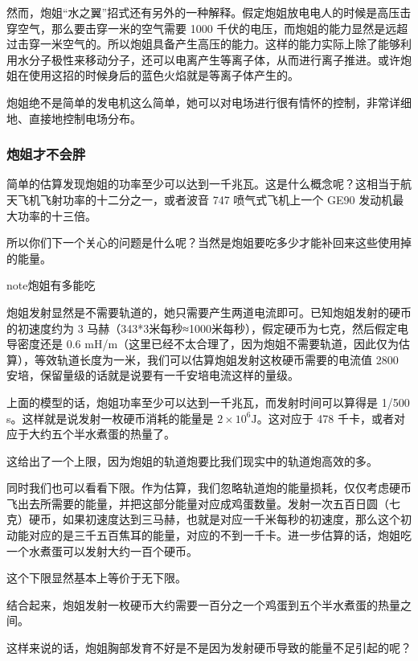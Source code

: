 \documentclass[letterpaper,10pt,english]{sphinxmanual}
\begin{document}
然而，炮姐“水之翼”招式还有另外的一种解释。假定炮姐放电电人的时候是高压击穿空气，那么要击穿一米的空气需要 1000 千伏的电压，而炮姐的能力显然是远超过击穿一米空气的。所以炮姐具备产生高压的能力。这样的能力实际上除了能够利用水分子极性来移动分子，还可以电离产生等离子体，从而进行离子推进。或许炮姐在使用这招的时候身后的蓝色火焰就是等离子体产生的。

炮姐绝不是简单的发电机这么简单，她可以对电场进行很有情怀的控制，非常详细地、直接地控制电场分布。


\subsubsection{炮姐才不会胖}
\label{superpower:id8}
简单的估算发现炮姐的功率至少可以达到一千兆瓦。这是什么概念呢？这相当于航天飞机飞射功率的十二分之一，或者波音 747 喷气式飞机上一个 GE90 发动机最大功率的十三倍。

所以你们下一个关心的问题是什么呢？当然是炮姐要吃多少才能补回来这些使用掉的能量。

\begin{notice}{note}{炮姐有多能吃}

炮姐发射显然是不需要轨道的，她只需要产生两道电流即可。已知炮姐发射的硬币的初速度约为 3 马赫（343*3米每秒≈1000米每秒），假定硬币为七克，然后假定电导密度还是 0.6 mH/m（这里已经不太合理了，因为炮姐不需要轨道，因此仅为估算），等效轨道长度为一米，我们可以估算炮姐发射这枚硬币需要的电流值 2800 安培，保留量级的话就是说要有一千安培电流这样的量级。
\end{notice}

上面的模型的话，炮姐功率至少可以达到一千兆瓦，而发射时间可以算得是 1/500 s。这样就是说发射一枚硬币消耗的能量是 $2\times 10^6 \mathrm{J}$。这对应于 478 千卡，或者对应于大约五个半水煮蛋的热量了。

这给出了一个上限，因为炮姐的轨道炮要比我们现实中的轨道炮高效的多。

同时我们也可以看看下限。作为估算，我们忽略轨道炮的能量损耗，仅仅考虑硬币飞出去所需要的能量，并把这部分能量对应成鸡蛋数量。发射一次五百日圆（七克）硬币，如果初速度达到三马赫，也就是对应一千米每秒的初速度，那么这个初动能对应的是三千五百焦耳的能量，对应的不到一千卡。进一步估算的话，炮姐吃一个水煮蛋可以发射大约一百个硬币。

这个下限显然基本上等价于无下限。

结合起来，炮姐发射一枚硬币大约需要一百分之一个鸡蛋到五个半水煮蛋的热量之间。

这样来说的话，炮姐胸部发育不好是不是因为发射硬币导致的能量不足引起的呢？
\end{document}
